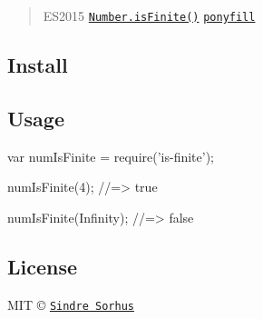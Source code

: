 \begin{quote}
E\+S2015 \href{https://developer.mozilla.org/en-US/docs/Web/JavaScript/Reference/Global_Objects/Number/isFinite}{\tt {\ttfamily Number.\+is\+Finite()}} \href{https://ponyfill.com}{\tt ponyfill} \end{quote}


\subsection*{Install}




\subsection*{Usage}


\begin{DoxyCode}
var numIsFinite = require('is-finite');

numIsFinite(4);
//=> true

numIsFinite(Infinity);
//=> false
\end{DoxyCode}


\subsection*{License}

M\+IT © \href{http://sindresorhus.com}{\tt Sindre Sorhus} 
